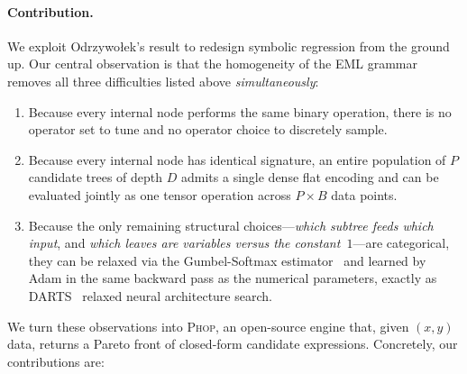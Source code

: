 \documentclass{article}
\begin{document}
\paragraph{Contribution.}
We exploit Odrzywo\l{}ek's result to redesign symbolic regression from
the ground up. Our central observation is that the homogeneity of the
EML grammar removes all three difficulties listed above
\emph{simultaneously}:

\begin{enumerate}
  \item Because every internal node performs the same binary
        operation, there is no operator set to tune and no operator
        choice to discretely sample.
  \item Because every internal node has identical signature, an entire
        population of $P$ candidate trees of depth $D$ admits a single
        dense flat encoding and can be evaluated jointly as one
        tensor operation across $P\times B$ data points.
  \item Because the only remaining structural choices—\emph{which
        subtree feeds which input}, and \emph{which leaves are
        variables versus the constant~$1$}—are categorical, they can
        be relaxed via the Gumbel-Softmax
        estimator~\cite{jang2017gumbel} and learned by Adam in the
        same backward pass as the numerical parameters, exactly as
        DARTS~\cite{liu2019darts} relaxed neural architecture search.
\end{enumerate}

We turn these observations into \textsc{Phop}, an open-source engine
that, given $(x,y)$ data, returns a Pareto front of closed-form
candidate expressions. Concretely, our contributions are:
\end{document}
